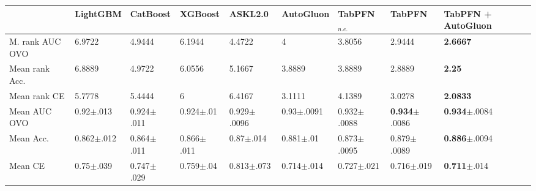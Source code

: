 \begin{tabular}{@{\hskip 0mm}
l@{\hskip 1mm}
l@{\hskip 1mm}
l@{\hskip 1mm}
l@{\hskip 1mm}
l@{\hskip 1mm}
l@{\hskip 1mm}
l@{\hskip 1mm}
l@{\hskip 1mm}
l@{\hskip 0mm}}
\toprule
{} &        LightGBM &        CatBoost &         XGBoost &          ASKL2.0 &        AutoGluon &  TabPFN$_{n.e.}$ &                    TabPFN &        TabPFN + AutoGluon \\
\midrule
M. rank AUC OVO
                                                  &          6.9722 &          4.9444 &          6.1944 &           4.4722 &                4 &           3.8056 &                    2.9444 &           \textbf{2.6667} \\
Mean rank Acc.                   &          6.8889 &          4.9722 &          6.0556 &           5.1667 &           3.8889 &           3.8889 &                    2.8889 &             \textbf{2.25} \\
Mean rank CE                     &          5.7778 &          5.4444 &               6 &           6.4167 &           3.1111 &           4.1389 &                    3.0278 &           \textbf{2.0833} \\
\midrule
Mean AUC OVO
                                                     &   0.92$\pm$.013 &  0.924$\pm$.011 &   0.924$\pm$.01 &  0.929$\pm$.0096 &   0.93$\pm$.0091 &  0.932$\pm$.0088 &  \textbf{0.934}$\pm$.0086 &  \textbf{0.934}$\pm$.0084 \\
Mean Acc.                        &  0.862$\pm$.012 &  0.864$\pm$.011 &  0.866$\pm$.011 &    0.87$\pm$.014 &    0.881$\pm$.01 &  0.873$\pm$.0095 &           0.879$\pm$.0089 &  \textbf{0.886}$\pm$.0094 \\
Mean CE                          &   0.75$\pm$.039 &  0.747$\pm$.029 &   0.759$\pm$.04 &   0.813$\pm$.073 &   0.714$\pm$.014 &   0.727$\pm$.021 &            0.716$\pm$.019 &   \textbf{0.711}$\pm$.014 \\

\end{tabular}
